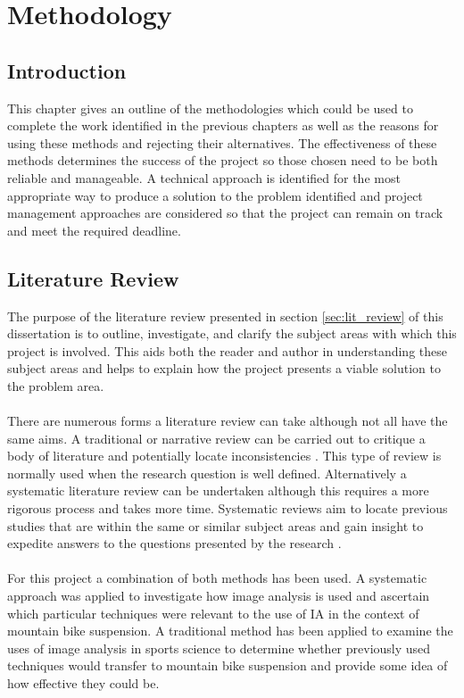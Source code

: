 \section{Methodology}\label{sec:methodology}
	\subsection{Introduction}
		This chapter gives an outline of the methodologies which could be used to complete the work identified in the previous chapters as well as the reasons for using these methods and rejecting their alternatives. The effectiveness of these methods determines the success of the project so those chosen need to be both reliable and manageable. A technical approach is identified for the most appropriate way to produce a solution to the problem identified and project management approaches are considered so that the project can remain on track and meet the required deadline.
	\subsection{Literature Review}
		The purpose of the literature review presented in section \ref{sec:lit_review} of this dissertation is to outline, investigate, and clarify the subject areas with which this project is involved. This aids both the reader and author in understanding these subject areas and helps to explain how the project presents a viable solution to the problem area.
		\\\\
		There are numerous forms a literature review can take although not all have the same aims. A traditional or narrative review can be carried out to critique a body of literature and potentially locate inconsistencies \citep{adams2007research}. This type of review is normally used when the research question is well defined. Alternatively a systematic literature review can be undertaken although this requires a more rigorous process and takes more time. Systematic reviews aim to locate previous studies that are within the same or similar subject areas and gain insight to expedite answers to the questions presented by the research \citep{kitchenham2009systematic}.
		\\\\
		For this project a combination of both methods has been used. A systematic approach was applied to investigate how image analysis is used and ascertain which particular techniques were relevant to the use of IA in the context of mountain bike suspension. A traditional method has been applied to examine the uses of image analysis in sports science to determine whether previously used techniques would transfer to mountain bike suspension and provide some idea of how effective they could be.
